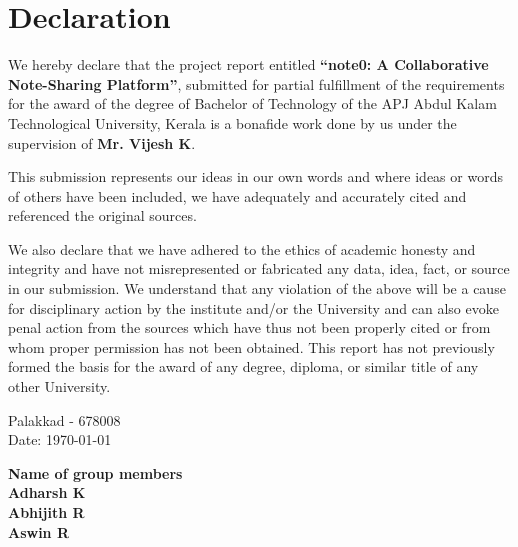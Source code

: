 \documentclass[12pt, a4paper]{report}
\begin{document}
\chapter*{\fontsize{24}{28}\selectfont Declaration}

We hereby declare that the project report entitled \textbf{“note0: A Collaborative Note-Sharing Platform”}, submitted for partial fulfillment of the requirements for the award of the degree of Bachelor of Technology of the APJ Abdul Kalam Technological University, Kerala is a bonafide work done by us under the supervision of \textbf{Mr. Vijesh K}.

\vspace{1cm}

This submission represents our ideas in our own words and where ideas or words of others have been included, we have adequately and accurately cited and referenced the original sources.

\vspace{1cm}

We also declare that we have adhered to the ethics of academic honesty and integrity and have not misrepresented or fabricated any data, idea, fact, or source in our submission. We understand that any violation of the above will be a cause for disciplinary action by the institute and/or the University and can also evoke penal action from the sources which have thus not been properly cited or from whom proper permission has not been obtained. This report has not previously formed the basis for the award of any degree, diploma, or similar title of any other University.

 
\vspace{1.5cm}
\noindent %
\begin{minipage}[t]{0.5\textwidth}
    \begin{flushleft} %
        Palakkad - 678008 \\
        \vspace{0.5cm}
        Date: \today
    \end{flushleft}
\end{minipage}%
\begin{minipage}[t]{0.5\textwidth}
    \begin{flushleft} %
        \textbf{Name of group members} \\
        \vspace{0.5cm} %
        \textbf{Adharsh K} \\
        \textbf{Abhijith R} \\
        \textbf{Aswin R} \\
    \end{flushleft}
\end{minipage}
\end{document}
